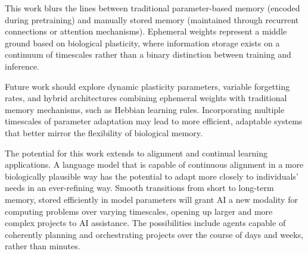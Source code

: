 \documentclass{article} %
\begin{document}
This work blurs the lines between traditional parameter-based memory (encoded during pretraining) and manually stored memory (maintained through recurrent connections or attention mechanisms). Ephemeral weights represent a middle ground based on biological plasticity, where information storage exists on a continuum of timescales rather than a binary distinction between training and inference.

Future work should explore dynamic plasticity parameters, variable forgetting rates, and hybrid architectures combining ephemeral weights with traditional memory mechanisms, such as Hebbian learning rules. Incorporating multiple timescales of parameter adaptation may lead to more efficient, adaptable systems that better mirror the flexibility of biological memory.

The potential for this work extends to alignment and continual learning applications. A language model that is capable of continuous alignment in a more biologically plausible way has the potential to adapt more closely to individuals' needs in an ever-refining way. Smooth transitions from short to long-term memory, stored efficiently in model parameters will grant AI a new modality for computing problems over varying timescales, opening up larger and more complex projects to AI assistance. The possibilities include agents capable of coherently planning and orchestrating projects over the course of days and weeks, rather than minutes.



\end{document}
